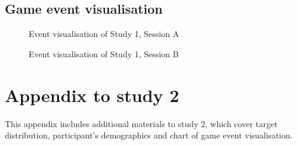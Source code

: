 \section{Game event visualisation}
\begin{figure}[H]
  \centering
  \caption{Event visualisation of Study 1, Session A}
  
\end{figure}

\begin{figure}[H]
  \centering
  \caption{Event visualisation of Study 1, Session B}
 
\end{figure}



\chapter{Appendix to study 2}
This appendix includes additional materials to study 2, which cover target distribution, participant's demographics and chart of game event visualisation.


